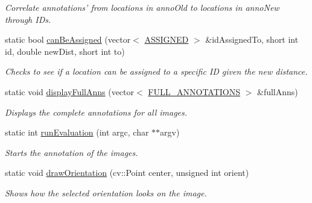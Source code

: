 \begin{DoxyCompactItemize}
\begin{DoxyCompactList}\small\item\em Correlate annotations' from locations in {\ttfamily annoOld} to locations in {\ttfamily annoNew} through IDs. \item\end{DoxyCompactList}\item 
\hypertarget{classannotationsHandle_a82a7f09d712d49ea099b3e9c9ffc04c5}{
static bool \hyperlink{classannotationsHandle_a82a7f09d712d49ea099b3e9c9ffc04c5}{canBeAssigned} (vector$<$ \hyperlink{structannotationsHandle_1_1ASSIGNED}{ASSIGNED} $>$ \&idAssignedTo, short int id, double newDist, short int to)}
\label{classannotationsHandle_a82a7f09d712d49ea099b3e9c9ffc04c5}

\begin{DoxyCompactList}\small\item\em Checks to see if a location can be assigned to a specific ID given the new distance. \item\end{DoxyCompactList}\item 
\hypertarget{classannotationsHandle_a86d06efe7aa6e013a5739a625bed6726}{
static void \hyperlink{classannotationsHandle_a86d06efe7aa6e013a5739a625bed6726}{displayFullAnns} (vector$<$ \hyperlink{structannotationsHandle_1_1FULL__ANNOTATIONS}{FULL\_\-ANNOTATIONS} $>$ \&fullAnns)}
\label{classannotationsHandle_a86d06efe7aa6e013a5739a625bed6726}

\begin{DoxyCompactList}\small\item\em Displays the complete annotations for all images. \item\end{DoxyCompactList}\item 
static int \hyperlink{classannotationsHandle_ac3568b677d066530fd771952492293c3}{runEvaluation} (int argc, char $\ast$$\ast$argv)
\begin{DoxyCompactList}\small\item\em Starts the annotation of the images. \item\end{DoxyCompactList}\item 
\hypertarget{classannotationsHandle_a6d11e0a0dbc45897a8176d5970af5438}{
static void \hyperlink{classannotationsHandle_a6d11e0a0dbc45897a8176d5970af5438}{drawOrientation} (cv::Point center, unsigned int orient)}
\label{classannotationsHandle_a6d11e0a0dbc45897a8176d5970af5438}

\begin{DoxyCompactList}\small\item\em Shows how the selected orientation looks on the image. \item\end{DoxyCompactList}\end{DoxyCompactItemize}


